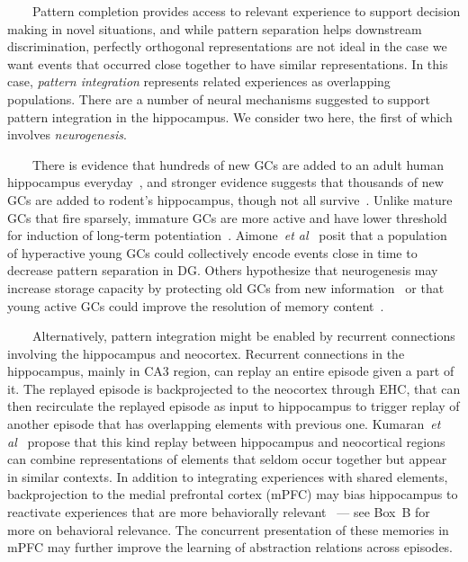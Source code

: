 \documentclass[letterpaper,11pt]{article}
\def\colorred#1{{\color{red}#1}}
\def\urlh#1{{}}
\def\emdash{---}
\def\etal{{\em{et al}}}
\begin{document}
\begin{center}
\begin{tcolorbox}[breakable,sharp corners=all,coltitle=black,colbacktitle=white,
    width=\textwidth,boxsep=5pt,left=5pt,right=5pt,
    title={\textbf{Box A: Pattern Separation, Completion and Integration}}]
~~~~Pattern completion provides access to relevant experience to support decision making in novel situations, and while pattern separation helps downstream discrimination, perfectly orthogonal representations are not ideal in the case we want events that occurred close together to have similar representations. In this case, {\it{pattern integration}} represents related experiences as overlapping populations. There are a number of neural mechanisms suggested to support pattern integration in the hippocampus. We consider two here, the first of which involves {\it{neurogenesis}}. 

~~~~There is evidence that hundreds of new GCs are added to an adult human hippocampus everyday~\cite{SpaldingetalCELL-13}, and stronger evidence suggests that thousands of new GCs are added to rodent’s hippocampus, though not all survive~\cite{KitabatakeetalNCNM-07}. Unlike mature GCs that fire sparsely, immature GCs are more active and have lower threshold for induction of long-term potentiation~\cite{AimoneetalNEURON-09,GeetalNATURE-06,Schmidt-HieberetalNATURE-04}. Aimone~\etal{}~\cite{AimoneetalNEURON-09} posit that a population of hyperactive young GCs could collectively encode events close in time to decrease pattern separation in DG. Others hypothesize that neurogenesis may increase storage capacity by protecting old GCs from new information~\cite{BeckerHIPPOCAMPUS-05,WiskottetalHIPPOCAMPUS-06} or that young active GCs could improve the resolution of memory content~\cite{AimoneetalNEURON-11}. 

~~~~Alternatively, pattern integration might be enabled by recurrent connections involving the hippocampus and neocortex. Recurrent connections in the hippocampus, mainly in CA3 region, can replay an entire episode given a part of it. The replayed episode is backprojected to the neocortex through EHC, that can then recirculate the replayed episode as input to hippocampus to trigger replay of another episode that has overlapping elements with previous one. Kumaran~\etal{}~\cite{KumaranetalTiCS-16} propose that this kind replay between hippocampus and neocortical regions can combine representations of elements that seldom occur together but appear in similar contexts. In addition to integrating experiences with shared elements, backprojection to the medial prefrontal cortex (mPFC) may bias hippocampus to reactivate experiences that are more behaviorally relevant~\cite{SchlichtingandPrestonCOiBS} {\emdash{}} see {\urlh{box_memories}{Box~\colorred{B}}} for more on behavioral relevance. The concurrent presentation of these memories in mPFC may further improve the learning of abstraction relations across episodes.

  \end{tcolorbox}
\end{center}
\end{document}

